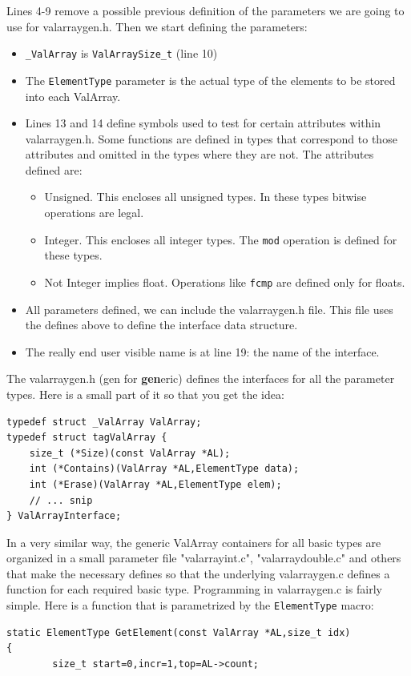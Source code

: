 \documentclass[12pt,a4paper,openany]{memoir} %
\begin{document}
{{\begin{verbatim}
\end{verbatim}
Lines 4-9 remove a possible previous definition of the parameters we are going to use for valarraygen.h. Then we start defining the parameters:
\begin{itemize}
\item \verb,_ValArray, is \verb,ValArraySize_t, (line 10)
\item The \verb,ElementType, parameter is the actual type of the elements to be stored into each ValArray.
\item Lines 13 and 14 define symbols used to test for certain attributes within valarraygen.h. Some functions are defined in types that 
correspond to those attributes and omitted in the types where they are not. The attributes defined are:
\begin{itemize}
\item Unsigned. This encloses all unsigned types. In these types bitwise operations are legal.
\item Integer. This encloses all integer types. The \verb,mod, operation is defined for these types.
\item Not Integer implies float. Operations like \verb,fcmp, are defined only for floats.
\end{itemize}
\item All parameters defined, we can include the valarraygen.h file. This file uses the defines above to define the interface data structure.
\item The really end user visible name is at line 19: the name of the interface. 
\end{itemize}
The valarraygen.h (gen for \textbf{gen}eric) defines the interfaces for all the parameter types.
Here is a small part of it so that you get the idea:
\begin{verbatim}
typedef struct _ValArray ValArray;
typedef struct tagValArray {
    size_t (*Size)(const ValArray *AL);
    int (*Contains)(ValArray *AL,ElementType data);
    int (*Erase)(ValArray *AL,ElementType elem);
    // ... snip
} ValArrayInterface;
\end{verbatim}
In a very similar way, the generic ValArray containers for all basic types are organized in a small parameter file "valarrayint.c", "valarraydouble.c"
and others that make the necessary defines so that the underlying valarraygen.c defines a function for each required basic type.
Programming in valarraygen.c is fairly simple. Here is a function that is parametrized by the \texttt{ElementType} macro:
\begin{verbatim}
static ElementType GetElement(const ValArray *AL,size_t idx)
{
        size_t start=0,incr=1,top=AL->count;


\end{verbatim}}}
\end{document}
